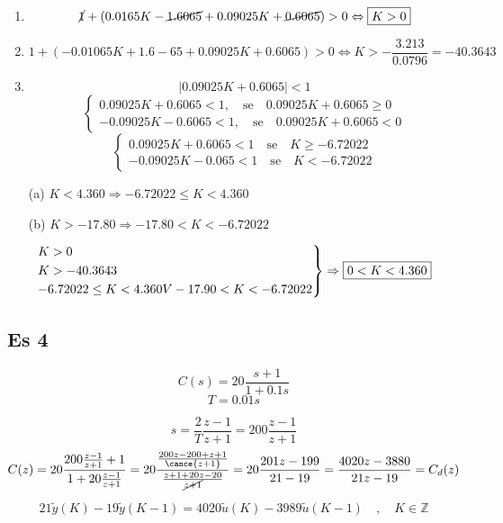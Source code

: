 \documentclass{article}
\begin{document}
\begin{enumerate}
    \item
        \[\cancel{1} + (0.0165K - \cancel{1.6065} + 0.09025K + \cancel{0.6065}) > 0 \Leftrightarrow \framebox{$K>0$}\]
    \item
        \[1 + (-0.01065K + 1.6-65 + 0.09025K + 0.6065) > 0 \Leftrightarrow K>-\frac{3.213}{0.0796} = -40.3643\]
    \item
        \[| 0.09025K + 0.6065| < 1 \]
        \[
            \begin{cases}
                0.09025K + 0.6065 < 1 ,\quad \text{se} \quad 0.09025K + 0.6065 \ge 0\\
                -0.09025K - 0.6065 < 1, \quad \text{se} \quad 0.09025K + 0.6065 < 0
            \end{cases}
        \]
        \[
            \begin{cases}
                0.09025K + 0.6065 < 1 \quad \text{se} \quad K\ge -6.72022\\
                -0.09025K - 0.065 < 1 \quad \text{se} \quad K < -6.72022
            \end{cases}
        \]
\end{enumerate}

\begin{itemize}
    \item[(a)] $ K < 4.360 \Rightarrow -6.72022 \le K < 4.360$
    \item[(b)] $ K > -17.80 \Rightarrow -17.80 < K < -6.72022$
\end{itemize}

\[
\begin{rcases}
    K> 0\\
    K > -40.3643\\
    -6.72022 \le K < 4.360 V -17.90 < K < -6.72022
\end{rcases} \Rightarrow \framebox{$0<K < 4.360$}
\]


\subsection{Es 4}
\[ C(s) = 20 \frac{s+1}{1+0.1s}\]
\[ T = 0.01s\]

\[s = \frac{2}{T} \frac{z-1}{z+1} = 200 \frac{z-1}{z+1}\]
\[ C(z) = 20 \frac{200\frac{z-1}{z+1} + 1}{1 + 20\frac{z-1}{z+1}} = 20 \frac{\frac{200z - 200 + z + 1}{\cance{z+1}}}{\frac{z+1+20z - 20}{\cancel{z+1}}} = 20\frac{201z - 199}{21 -19} = \frac{4020z- 3880}{21z - 19} = C_d(z)\]

\[ 21\tilde{y}(K) - 19\tilde{y}(K-1) = 4020\tilde{u}(K) - 3989\tilde{u}(K-1)\quad,\quad K \in \mathbb{Z}\]
\end{document}
